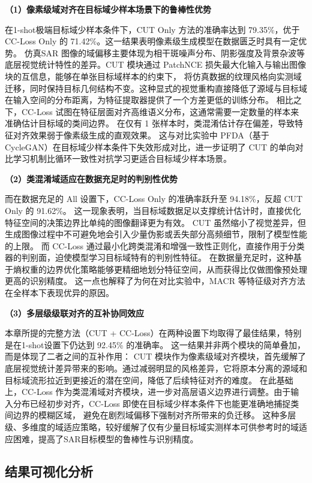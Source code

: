 \textbf{（1）像素级域对齐在目标域少样本场景下的鲁棒性优势}

在1-shot极端目标域少样本条件下，CUT Only 方法的准确率达到 79.35\%，优于 CC-Loss Only 的 71.42\%。这一结果表明像素级生成模型在数据匮乏时具有一定优势。
仿真SAR 图像的域偏移主要体现为相干斑噪声分布、阴影强度及背景杂波等底层视觉统计特性的差异。CUT 模块通过 PatchNCE 损失最大化输入与输出图像块的互信息，能够在单张目标域样本的约束下，
将仿真数据的纹理风格向实测域迁移，同时保持目标几何结构不变。这种显式的视觉重构直接降低了源域与目标域在输入空间的分布距离，为特征提取器提供了一个方差更低的训练分布。
相比之下，CC-Loss 试图在特征层面对齐高维语义分布，这通常需要一定数量的样本来准确估计目标域的类间边界。
在仅有 1 张样本时，类混淆估计存在偏差，导致特征对齐效果弱于像素级生成的直观效果。
这与对比实验中 PFDA（基于 CycleGAN）在目标域少样本条件下失效形成对比，进一步证明了 CUT 的单向对比学习机制比循环一致性对抗学习更适合目标域少样本场景。

\textbf{（2）类混淆域适应在数据充足时的判别性优势}

而在数据充足的 All 设置下，CC-Loss Only 的准确率跃升至 94.18\%，反超 CUT Only 的 91.62\%。
这一现象表明，当目标域数据足以支撑统计估计时，直接优化特征空间的决策边界比单纯的图像翻译更为有效。
CUT 虽然缩小了视觉差异，但生成图像过程中不可避免地会引入少量伪影或丢失部分高频细节，限制了模型性能的上限。
而 CC-Loss 通过最小化跨类混淆和增强一致性正则化，直接作用于分类器的判别面，迫使模型学习目标域特有的判别性特征。
在数据量充足时，这种基于熵权重的边界优化策略能够更精细地划分特征空间，从而获得比仅做图像预处理更高的识别精度。
这一点也解释了为何在对比实验中，MACR 等特征级对齐方法在全样本下表现优异的原因。

\textbf{（3）多层级级联对齐的互补协同效应}

本章所提的完整方法（CUT + CC-Loss）在两种设置下均取得了最佳结果，特别是在1-shot设置下仍达到 92.45\% 的准确率。
这一结果并非两个模块的简单叠加，而是体现了二者之间的互补作用：
CUT 模块作为像素级域对齐模块，首先缓解了底层视觉统计差异带来的影响。通过减弱明显的风格差异，它将原本分离的源域和目标域流形拉近到更接近的潜在空间，降低了后续特征对齐的难度。
在此基础上，CC-Loss 作为类混淆域对齐模块，进一步对高层语义边界进行调整。由于输入分布已经初步对齐，CC-Loss 即使在目标域少样本条件下也能更准确地捕捉类间边界的模糊区域，
避免在剧烈域偏移下强制对齐所带来的负迁移。
这种多层级、多维度的域适应策略，较好缓解了仅有少量目标域实测样本可供参考时的域适应困难，提高了SAR目标模型的鲁棒性与识别精度。


\subsection{结果可视化分析}

